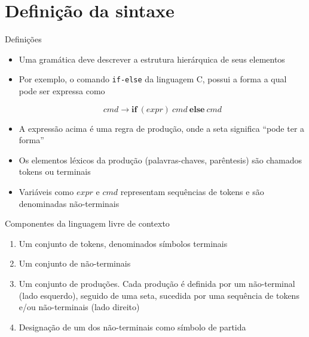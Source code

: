\section{Definição da sintaxe}

\begin{frame}[fragile]{Definições}

    \begin{itemize}
        \item Uma gramática deve descrever a estrutura hierárquica de seus elementos

        \item Por exemplo, o comando \texttt{if-else} da linguagem C, possui a forma
        a qual pode ser expressa como
        \begin{footnotesize}
        \[
            cmd \to \mathbf{if}\ (expr)\ cmd\ \mathbf{else}\ cmd
        \] 
        \end{footnotesize}%
        \item A expressão acima é uma regra de produção, onde a seta significa ``pode ter a forma''

        \item Os elementos léxicos da produção (palavras-chaves, parêntesis) são chamados tokens ou terminais

        \item Variáveis como $expr$ e  $cmd$ representam sequências de tokens e são denominadas não-terminais
    \end{itemize}

\end{frame}

\begin{frame}[fragile]{Componentes da linguagem livre de contexto}

    \begin{enumerate}
        \item Um conjunto de tokens, denominados símbolos terminais

        \item Um conjunto de não-terminais

        \item Um conjunto de produções. Cada produção é definida por um não-terminal (lado esquerdo), seguido de uma seta, sucedida por uma sequência de tokens
            e/ou não-terminais (lado direito)

        \item Designação de um dos não-terminais como símbolo de partida
    \end{enumerate}

\end{frame}

